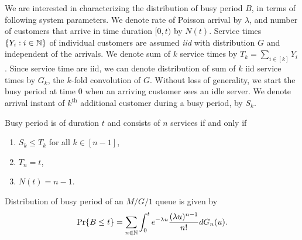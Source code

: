 \documentclass[a4paper,english,10pt]{article}
\begin{document}
We are interested in characterizing the distribution of busy period $B$, in terms of following system parameters.
We denote rate of Poisson arrival by $\lambda$, and number of customers that arrive in time duration $[0,t)$ by $N(t)$.
Service times $\{Y_i: i \in \mathbb{N}\}$ of individual customers are assumed \emph{iid} with distribution $G$ and independent of the arrivals.
We denote sum of $k$ service times by $T_k = \sum_{i \in [k]}Y_i$.
Since service time are iid, we can denote distribution of sum of $k$ iid service times by $G_k$, the $k$-fold convolution of $G$.
Without loss of generality, we start the busy period at time $0$ when an arriving customer sees an idle server.
We denote arrival instant of $k^{\text{th}}$ additional customer during a busy period, by $S_k$.%
\begin{lem}
\label{Lemma:Equivalence}
Busy period is of duration $t$ and consists of $n$ services if and only if
\begin{enumerate}
	\item $S_k \leq T_k$ for all $k \in [n-1]$,
	\item $T_n=t$,
	\item $N(t)=n-1$.
\end{enumerate}
\end{lem}
\begin{thm}
Distribution of busy period of an $M/G/1$ queue is given by
\begin{align*}
\Pr\{B \leq t\}  = \sum_{n \in \mathbb{N}}\int_{0}^te^{-\lambda u}\frac{(\lambda u)^{n-1}}{n!}dG_n(u).
\end{align*}
\end{thm}
\end{document}
